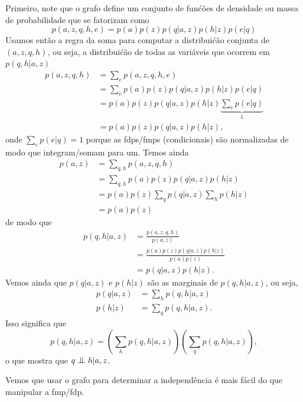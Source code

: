 \begin{exenumerate}
\begin{solution}
        Primeiro, note que o grafo define um conjunto de fun\'c\~oes de densidade
        ou massa de probabilidade que se fatorizam como
        $$ p(a,z,q,h,e) = p(a) p(z) p(q|a,z) p(h|z) p(e|q)$$ Usamos ent\~ao a regra da soma para
        computar a distribui\'c\~ao conjunta de $(a,z,q,h)$, ou seja, a
        distribui\'c\~ao de todas as vari\'aveis que ocorrem em $p(q,h|a,z)$ 
        \begin{align}
            p(a,z,q,h) &= \sum_{e} p(a,z,q,h,e)\\
            &= \sum_{e}  p(a) p(z) p(q|a,z) p(h|z) p(e|q)\\
            & =  p(a) p(z) p(q|a,z) p(h|z) \underbrace{\sum_{e}  p(e|q)}_{1}\\
            & =  p(a) p(z) p(q|a,z) p(h|z),
        \end{align}
        onde $\sum_{e}  p(e|q) = 1$ porque as fdps/fmps (condicionais) s\~ao normalizadas de modo que integram/somam para um. Temos ainda
        \begin{align}
            p(a,z) & = \sum_{q,h} p(a,z,q,h)\\
            & = \sum_{q,h} p(a) p(z) p(q|a,z) p(h|z)\\
            & = p(a) p(z) \sum_{q}  p(q|a,z) \sum_h p(h|z)\\
            & = p(a) p(z)
        \end{align}
        de modo que
        \begin{align}
            p(q,h | a,z) & = \frac{ p(a,z,q,h)}{ p(a,z)} \\
            & = \frac{ p(a) p(z) p(q|a,z) p(h|z)}{ p(a) p(z)}\\
            & =  p(q|a,z) p(h|z).
        \end{align}        
        Vemos ainda que $p(q| a,z)$ e $p(h|z)$ s\~ao as marginais de $p(q,h|a,z)$, ou seja,
        \begin{align}
            p(q| a,z) & = \sum_h  p(q,h | a,z)\\
            p(h|z) & = \sum_q  p(q,h | a,z).
        \end{align}
        Isso significa que
        \begin{equation}
            p(q,h | a,z) =\left( \sum_h  p(q,h | a,z) \right) \left(\sum_q  p(q,h | a,z) \right),
        \end{equation}
        o que mostra que $q \mathrel{\perp\mspace{-10mu}\perp} h | a,z$.
        
        Vemos que usar o grafo para determinar a independ\^encia \'e
        mais f\'acil do que manipular a fmp/fdp.
        
    \end{solution}
    
\end{exenumerate}

